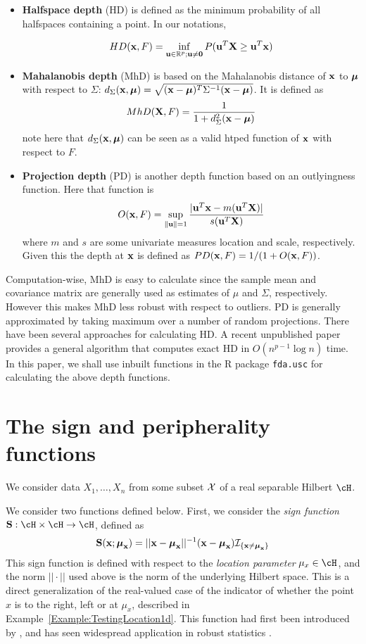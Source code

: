 \documentclass[fleqn,11pt]{article}
\begin{document}
\begin{itemize}
\item \textbf{Halfspace depth} (HD) \citep{tukey75} is defined as the minimum probability of all halfspaces containing a point. In our notations,

$$ HD({\bf{x}}, F)  = \inf_{{\bf{u}} \in \mathbb{R}^p; {\bf{u}} \neq \bf0} P({\bf{u}}^T {\mathbf{X}} \geq {\bf{u}}^T {\bf{x}}) $$

\item \textbf{Mahalanobis depth} (MhD) \citep{LiuPareliusSingh99} is based on the Mahalanobis distance of ${\bf{x}}$ to ${\boldsymbol{\mu}}$ with respect to $\Sigma$: $d_\Sigma({\bf{x}}, {\boldsymbol{\mu}}) = \sqrt{({\bf{x}} - {\boldsymbol{\mu}})^T \Sigma^{-1} ({\bf{x}} - {\boldsymbol{\mu}})}$. It is defined as
%
$$ MhD({\mathbf{X}}, F) = \frac{1}{1 + d^2_\Sigma ({\bf{x}} - {\boldsymbol{\mu}})} $$
%
note here that $d_\Sigma({\bf{x}},{\boldsymbol{\mu}})$ can be seen as a valid htped function of ${\bf{x}}$ with respect to $F$.

\item \textbf{Projection depth} (PD) \citep{zuo03} is another depth function based on an outlyingness function. Here that function is
%
$$ O({\bf{x}}, F) = \sup_{\| {\bf{u}} \| = 1} \frac{| {\bf{u}}^T{\bf{x}} - m({\bf{u}}^T{\mathbf{X}})|}{s({\bf{u}}^T{\mathbf{X}})} $$
%
where $m$ and $s$ are some univariate measures location and scale, respectively. Given this the depth at ${\bf{x}}$ is defined as $PD({\bf{x}}, F) = 1/(1+O({\bf{x}}, F))$.
\end{itemize}

Computation-wise, MhD is easy to calculate since the sample mean and covariance matrix are generally used as estimates of $\mu$ and $\Sigma$, respectively. However this makes MhD less robust with respect to outliers. PD is generally approximated by taking maximum over a number of random projections. There have been several approaches for calculating HD. A recent unpublished paper \citep{rainerArxiv} provides a general algorithm that computes exact HD in $O(n^{p-1}\log n)$ time. In this paper, we shall use inbuilt functions in the R package \texttt{fda.usc} for calculating the above depth functions.

\section{The sign and peripherality functions}
\label{Section:SP}
 
We consider data $X_{1}, \ldots, X_{n}$ from some subset ${\cal{X}}$ of 
a real separable Hilbert $\cH$. 

We consider two functions defined below. First, we consider the 
{\it sign function} $\bfS : \cH \times \cH \rightarrow \cH$, defined as
%
$$
{\mathbf{S}} ({\bf{x}}; {\boldsymbol{\mu}}_{{\bf{x}}}) = || {\bf{x}} - {\boldsymbol{\mu}}_{{\bf{x}}} ||^{-1} ({\bf{x}} - {\boldsymbol{\mu}}_{{\bf{x}}}) {{\cal{I}}}_{ \{ {\bf{x}} \ne {\boldsymbol{\mu}}_{{\bf{x}}} \}}
$$
%
This sign function is defined with respect to the {\it location parameter} 
$\mu_{x} \in \cH$, and the norm $|| \cdot ||$ used above is the norm of the 
underlying Hilbert space. This is a direct  generalization of the 
real-valued case of the indicator of whether the point $x$ is to the right, 
left or at $\mu_{x}$, described in Example~\ref{Example:TestingLocation1d}. 
This function had first been introduced by \cite{MottonenOja95}, and has seen widespread application in robust statistics \citep{locantore99, OjaBook10}.
\end{document}
